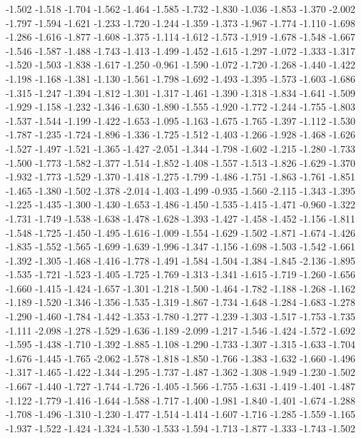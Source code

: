 \documentclass[9pt]{article}
\theoremstyle{plain}
\theoremstyle{definition}
\theoremstyle{remark}
\numberwithin{equation}{section}
\begin{document}
-1.502
-1.518
-1.704
-1.562
-1.464
-1.585
-1.732
-1.830
-1.036
-1.853
-1.370
-2.002
-1.797
-1.594
-1.621
-1.233
-1.720
-1.244
-1.359
-1.373
-1.967
-1.774
-1.110
-1.698
-1.286
-1.616
-1.877
-1.608
-1.375
-1.114
-1.612
-1.573
-1.919
-1.678
-1.548
-1.667
-1.546
-1.587
-1.488
-1.743
-1.413
-1.499
-1.452
-1.615
-1.297
-1.072
-1.333
-1.317
-1.520
-1.503
-1.838
-1.617
-1.250
-0.961
-1.590
-1.072
-1.720
-1.268
-1.440
-1.422
-1.198
-1.168
-1.381
-1.130
-1.561
-1.798
-1.692
-1.493
-1.395
-1.573
-1.603
-1.686
-1.315
-1.247
-1.394
-1.812
-1.301
-1.317
-1.461
-1.390
-1.318
-1.834
-1.641
-1.509
-1.929
-1.158
-1.232
-1.346
-1.630
-1.890
-1.555
-1.920
-1.772
-1.244
-1.755
-1.803
-1.537
-1.544
-1.199
-1.422
-1.653
-1.095
-1.163
-1.675
-1.765
-1.397
-1.112
-1.530
-1.787
-1.235
-1.724
-1.896
-1.336
-1.725
-1.512
-1.403
-1.266
-1.928
-1.468
-1.626
-1.527
-1.497
-1.521
-1.365
-1.427
-2.051
-1.344
-1.798
-1.602
-1.215
-1.280
-1.733
-1.500
-1.773
-1.582
-1.377
-1.514
-1.852
-1.408
-1.557
-1.513
-1.826
-1.629
-1.370
-1.932
-1.773
-1.529
-1.370
-1.418
-1.275
-1.799
-1.486
-1.751
-1.863
-1.761
-1.851
-1.465
-1.380
-1.502
-1.378
-2.014
-1.403
-1.499
-0.935
-1.560
-2.115
-1.343
-1.395
-1.225
-1.435
-1.300
-1.430
-1.653
-1.486
-1.450
-1.535
-1.415
-1.471
-0.960
-1.322
-1.731
-1.749
-1.538
-1.638
-1.478
-1.628
-1.393
-1.427
-1.458
-1.452
-1.156
-1.811
-1.548
-1.725
-1.450
-1.495
-1.616
-1.009
-1.554
-1.629
-1.502
-1.871
-1.674
-1.426
-1.835
-1.552
-1.565
-1.699
-1.639
-1.996
-1.347
-1.156
-1.698
-1.503
-1.542
-1.661
-1.392
-1.305
-1.468
-1.416
-1.778
-1.491
-1.584
-1.504
-1.384
-1.845
-2.136
-1.895
-1.535
-1.721
-1.523
-1.405
-1.725
-1.769
-1.313
-1.341
-1.615
-1.719
-1.260
-1.656
-1.660
-1.415
-1.424
-1.657
-1.301
-1.218
-1.500
-1.464
-1.782
-1.188
-1.268
-1.162
-1.189
-1.520
-1.346
-1.356
-1.535
-1.319
-1.867
-1.734
-1.648
-1.284
-1.683
-1.278
-1.290
-1.460
-1.784
-1.442
-1.353
-1.780
-1.277
-1.239
-1.303
-1.517
-1.753
-1.735
-1.111
-2.098
-1.278
-1.529
-1.636
-1.189
-2.099
-1.217
-1.546
-1.424
-1.572
-1.692
-1.595
-1.438
-1.710
-1.392
-1.885
-1.108
-1.290
-1.733
-1.307
-1.315
-1.633
-1.704
-1.676
-1.445
-1.765
-2.062
-1.578
-1.818
-1.850
-1.766
-1.383
-1.632
-1.660
-1.496
-1.317
-1.465
-1.422
-1.344
-1.295
-1.737
-1.487
-1.362
-1.308
-1.949
-1.230
-1.502
-1.667
-1.440
-1.727
-1.744
-1.726
-1.405
-1.566
-1.755
-1.631
-1.419
-1.401
-1.487
-1.122
-1.779
-1.416
-1.644
-1.588
-1.717
-1.400
-1.981
-1.840
-1.401
-1.674
-1.288
-1.708
-1.496
-1.310
-1.230
-1.477
-1.514
-1.414
-1.607
-1.716
-1.285
-1.559
-1.165
-1.937
-1.522
-1.424
-1.324
-1.530
-1.533
-1.594
-1.713
-1.877
-1.333
-1.743
-1.502
\end{document}
